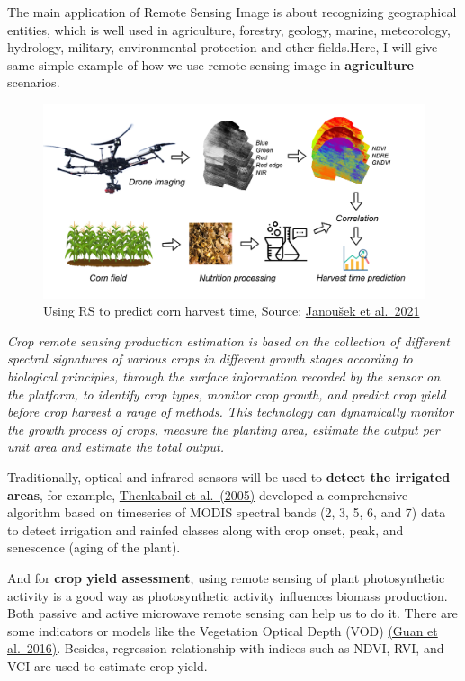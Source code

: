 \documentclass[
  letterpaper,
  DIV=11,
  numbers=noendperiod]{scrreprt}
\begin{document}
The main application of Remote Sensing Image is about recognizing
geographical entities, which is well used in agriculture, forestry,
geology, marine, meteorology, hydrology, military, environmental
protection and other fields.Here, I will give same simple example of how
we use remote sensing image in \textbf{agriculture} scenarios.

\begin{figure}

{\centering \includegraphics{./image/application1.webp}

}

\caption{Using RS to predict corn harvest time, Source:
\href{https://doi.org/10.3390/rs13101878}{Janoušek et al.~2021}}

\end{figure}

\emph{Crop remote sensing production estimation is based on the
collection of different spectral signatures of various crops in
different growth stages according to biological principles, through the
surface information recorded by the sensor on the platform, to identify
crop types, monitor crop growth, and predict crop yield before crop
harvest a range of methods. This technology can dynamically monitor the
growth process of crops, measure the planting area, estimate the output
per unit area and estimate the total output.}

Traditionally, optical and infrared sensors will be used to
\textbf{detect the irrigated areas}, for example,
\href{https://doi.org/10.1016/j.rse.2004.12.018}{Thenkabail et
al.~(2005)} developed a comprehensive algorithm based on timeseries of
MODIS spectral bands (2, 3, 5, 6, and 7) data to detect irrigation and
rainfed classes along with crop onset, peak, and senescence (aging of
the plant).

And for \textbf{crop yield assessment}, using remote sensing of plant
photosynthetic activity is a good way as photosynthetic activity
influences biomass production. Both passive and active microwave remote
sensing can help us to do it. There are some indicators or models like
the Vegetation Optical Depth (VOD)
\href{https://doi.org/10.1016/j.rse.2015.10.021}{(Guan et al.~2016)}.
Besides, regression relationship with indices such as NDVI, RVI, and VCI
are used to estimate crop yield.
\end{document}
